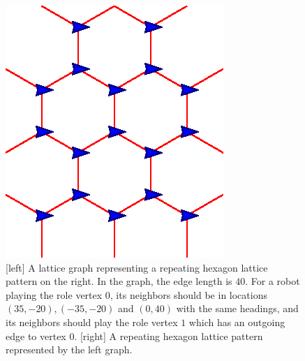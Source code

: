 \begin{figure}
    \centering
    \begin{minipage}[b]{0.45\linewidth}
        \centering
        
    \end{minipage}
    \begin{minipage}[b]{0.45\linewidth}
        \centering
        \includegraphics[scale=0.85]{figs/hex-lat}
    \end{minipage}
    \caption{[left] A lattice graph representing a repeating hexagon lattice pattern on the right. 
    In the graph, the edge length is $40$. 
    For a robot playing the role vertex $0$, its neighbors should be in locations $(35, -20), (-35, -20)$ and $(0, 40)$ with the same headings, and its neighbors should play the role vertex $1$ which has an outgoing edge to vertex $0$. 
    [right] A repeating hexagon lattice pattern represented by the left graph.}
    \label{fig:hex}
\end{figure}
